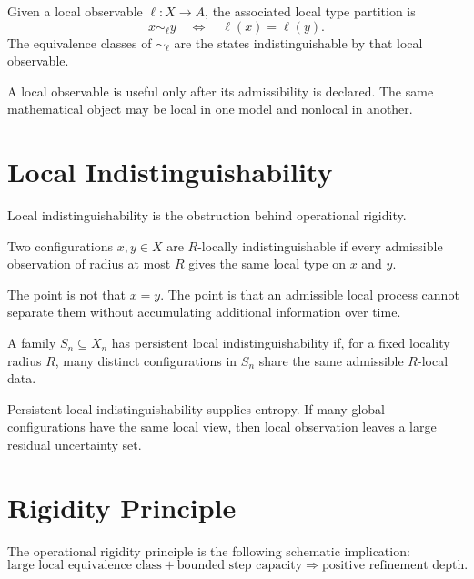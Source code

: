 \begin{definition}
Given a local observable \(\ell:X\to A\), the associated local type partition
is
\[
x\sim_{\ell} y
\quad\Longleftrightarrow\quad
\ell(x)=\ell(y).
\]
The equivalence classes of \(\sim_{\ell}\) are the states indistinguishable by
that local observable.
\end{definition}

A local observable is useful only after its admissibility is declared. The same
mathematical object may be local in one model and nonlocal in another.

\section{Local Indistinguishability}

Local indistinguishability is the obstruction behind operational rigidity.

\begin{definition}
Two configurations \(x,y\in X\) are \(R\)-locally indistinguishable if every
admissible observation of radius at most \(R\) gives the same local type on
\(x\) and \(y\).
\end{definition}

The point is not that \(x=y\). The point is that an admissible local process
cannot separate them without accumulating additional information over time.

\begin{definition}
A family \(S_n\subseteq X_n\) has persistent local indistinguishability if,
for a fixed locality radius \(R\), many distinct configurations in \(S_n\)
share the same admissible \(R\)-local data.
\end{definition}

Persistent local indistinguishability supplies entropy. If many global
configurations have the same local view, then local observation leaves a large
residual uncertainty set.

\section{Rigidity Principle}

The operational rigidity principle is the following schematic implication:
\[
\text{large local equivalence class}
+
\text{bounded step capacity}
\Longrightarrow
\text{positive refinement depth}.
\]

